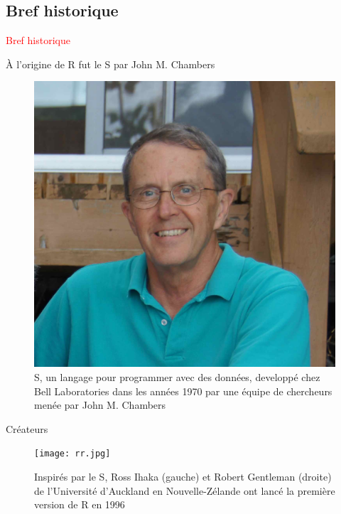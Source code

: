 \documentclass[11pt]{beamer}\usepackage[]{graphicx}\usepackage[]{color}
\begin{document}
\subsection{Bref historique}

\begin{frame}
 \begin{center}
  \Huge{\textcolor{red}{Bref historique}}
 \end{center}
\end{frame}


\begin{frame}{\`{A} l'origine de R fut le S par John M. Chambers}
\begin{center}
\begin{figure}
\includegraphics[scale=0.10]{john.jpg}
\caption{S, un langage pour programmer avec des donn\'{e}es, developp\'{e} chez Bell Laboratories dans les ann\'{e}es 1970 par une \'{e}quipe de chercheurs men\'{e}e par John M. Chambers}
\end{figure}
\end{center}
\end{frame}


\begin{frame}{Cr\'{e}ateurs}
\begin{center}
\begin{figure}
\texttt{[image: rr.jpg]}
\caption{Inspir\'{e}s par le S, Ross Ihaka (gauche) et Robert Gentleman (droite) de l'Universit\'{e} d'Auckland en Nouvelle-Z\'{e}lande ont lanc\'{e} la premi\`{e}re version de R en 1996}
\end{figure}
\end{center}
\end{frame}
\end{document}
